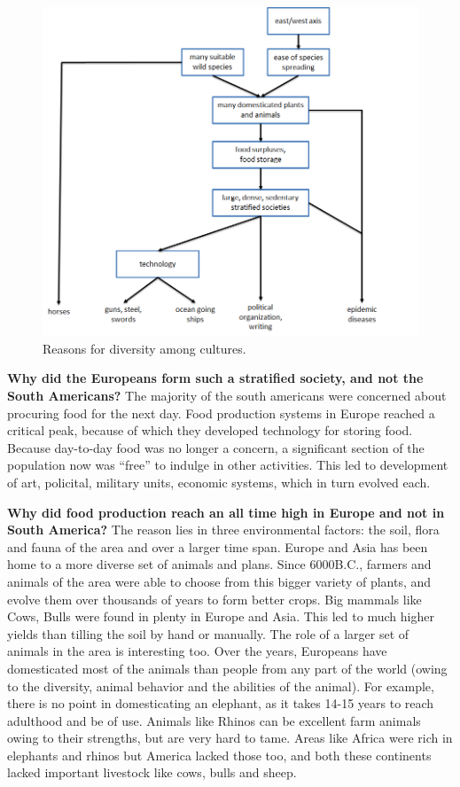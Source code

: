 \begin{figure}[t]
\centering
\includegraphics[width=\textwidth]{media/chapter2/axis.png}
\caption{Reasons for diversity among cultures.}
\label{fig:axis-flowchart}
\end{figure}

\textbf{Why did the Europeans form such a stratified society, and not the South Americans?} The majority of the south americans were concerned about procuring food for the next day. Food production systems in Europe reached a critical peak, because of which they developed technology for storing food. Because day-to-day food was no longer a concern, a significant section of the population now was ``free'' to indulge in other activities. This led to development of art, policital, military units, economic systems, which in turn evolved each.

\textbf{Why did food production reach an all time high in Europe and not in South America?} The reason lies in three environmental factors: the soil, flora and fauna of the area and over a larger time span. Europe and Asia has been home to a more diverse set of animals and plans. Since 6000B.C., farmers and animals of the area were able to choose from this bigger variety of plants, and evolve them over thousands of years to form better crops. Big mammals like Cows, Bulls were found in plenty in Europe and Asia. This led to much higher yields than tilling the soil by hand or manually. The role of a larger set of animals in the area is interesting too. Over the years, Europeans have domesticated most of the animals than people from any part of the world (owing to the diversity, animal behavior and the abilities of the animal). For example, there is no point in domesticating an elephant, as it takes 14-15 years to reach adulthood and be of use. Animals like Rhinos can be excellent farm animals owing to their strengths, but are very hard to tame. Areas like Africa were rich in elephants and rhinos but America lacked those too, and both these continents lacked important livestock like cows, bulls and sheep.

